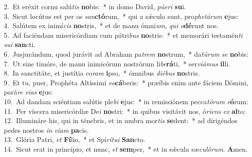 {2.~}Et eréxit cornu salú\textit{tis} \textbf{no}bis:~* in domo David, \textit{pú}\textit{e}\textit{ri} \textbf{su}i.\\
{3.~}Sicut locútus est per os \textit{san}\textbf{ctó}rum,~* qui a sǽculo sunt, pro\textit{phe}\textit{tá}\textit{rum} \textbf{e}jus:\\
{4.~}Salútem ex inimí\textit{cis} \textbf{no}stris,~* et de manu ómni\textit{um}, \textit{qui} \textit{o}\textbf{dé}runt nos.\\
{5.~}Ad faciéndam misericórdiam cum pátri\textit{bus} \textbf{no}stris:~* et memorári testamén\textit{ti} \textit{su}\textit{i} \textbf{san}cti.\\
{6.~}Jusjurándum, quod jurávit ad Abraham pa\textit{trem} \textbf{no}strum,~* da\textit{tú}\textit{rum} \textit{se} \textbf{no}bis:\\
{7.~}Ut sine timóre, de manu inimicórum nostrórum li\textit{be}\textbf{rá}ti,~* ser\textit{vi}\textit{á}\textit{mus} \textbf{il}li.\\
{8.~}In sanctitáte, et justítia co\textit{ram} \textbf{i}pso,~* ómnibus \textit{di}\textit{é}\textit{bus} \textbf{no}stris.\\
{9.~}Et tu, puer, Prophéta Altíssimi \textit{vo}\textbf{cá}beris:~* præíbis enim ante fáciem Dómini, pará\textit{re} \textit{vi}\textit{as} \textbf{e}jus:\\
{10.~}Ad dandam sciéntiam salútis ple\textit{bi} \textbf{e}jus:~* in remissiónem pecca\textit{tó}\textit{rum} \textit{e}\textbf{ó}rum:\\
{11.~}Per víscera misericórdiæ De\textit{i} \textbf{no}stri:~* in quibus visitávit nos, ó\textit{ri}\textit{ens} \textit{ex} \textbf{al}to:\\
{12.~}Illumináre his, qui in ténebris, et in umbra mor\textit{tis} \textbf{se}dent:~* ad dirigéndos pedes nostros \textit{in} \textit{vi}\textit{am} \textbf{pa}cis.\\
{13.~}Glória Patri, \textit{et} \textbf{Fí}lio,~* et Spi\textit{rí}\textit{tu}\textit{i} \textbf{San}cto.\\
{14.~}Sicut erat in princípio, et nunc, \textit{et} \textbf{sem}per,~* et in sǽcula sæ\textit{cu}\textit{ló}\textit{rum}. \textbf{A}men.\\
